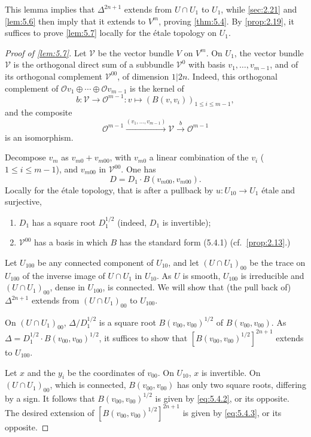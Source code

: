 \documentclass[11pt,a4paper]{article}
\theoremstyle{plain}
\theoremstyle{definition}
\begin{document}
This lemma implies that $\Delta^{2n+1}$ extends from $U \cap U_1$ to $U_1$, while \ref{sec:2.21} and \ref{lem:5.6} then imply that it extends to $V^m$, proving \ref{thm:5.4}. By \ref{prop:2.19}, it suffices to prove \ref{lem:5.7} locally for the \'etale topology on $U_1$.

\begin{proof}[Proof of \ref{lem:5.7}]
Let $\mathcal{V}$ be the vector bundle $V$ on $V^m$. On $U_1$, the vector bundle $\mathcal{V}$ is the orthogonal direct sum of a subbundle $\mathcal{V}^0$ with basis $v_1,\dots,v_{m-1}$, and of its orthogonal complement $\mathcal{V}^{00}$, of dimension $1|2n$. Indeed, this orthogonal complement of $\mathcal{O}v_1 \oplus \cdots \oplus \mathcal{O}v_{m-1}$ is the kernel of
\[
b : \mathcal{V} \to \mathcal{O}^{m-1} : v \mapsto (B(v, v_i))_{1 \leq i \leq m-1},
\]
and the composite
\[
\mathcal{O}^{m-1} \xrightarrow{(v_1,\dots,v_{m-1})} \mathcal{V} \xrightarrow{b} \mathcal{O}^{m-1}
\]
is an isomorphism.

Decompose $v_m$ as $v_{m0} + v_{m00}$, with $v_{m0}$ a linear combination of the $v_i$ ($1 \leq i \leq m-1$), and $v_{m00}$ in $\mathcal{V}^{00}$. One has
\[
D = D_1 \cdot B(v_{m00}, v_{m00}).
\]
Locally for the \'etale topology, that is after a pullback by $u: U_{10} \to U_1$ \'etale and surjective,
\begin{enumerate}[label=(\alph*)]
\item $D_1$ has a square root $D_1^{1/2}$ (indeed, $D_1$ is invertible);
\item $\mathcal{V}^{00}$ has a basis in which $B$ has the standard form (5.4.1) (cf.~\ref{prop:2.13}.)
\end{enumerate}

Let $U_{100}$ be any connected component of $U_{10}$, and let $(U \cap U_1)_{00}$ be the trace on $U_{100}$ of the inverse image of $U \cap U_1$ in $U_{10}$. As $U$ is smooth, $U_{100}$ is irreducible and $(U \cap U_1)_{00}$, dense in $U_{100}$, is connected. We will show that (the pull back of) $\Delta^{2n+1}$ extends from $(U \cap U_1)_{00}$ to $U_{100}$.

On $(U \cap U_1)_{00}$, $\Delta/D_1^{1/2}$ is a square root $B(v_{00}, v_{00})^{1/2}$ of $B(v_{00}, v_{00})$. As $\Delta = D_1^{1/2} \cdot B(v_{00}, v_{00})^{1/2}$, it suffices to show that $[B(v_{00}, v_{00})^{1/2}]^{2n+1}$ extends to $U_{100}$.

Let $x$ and the $y_i$ be the coordinates of $v_{00}$. On $U_{10}$, $x$ is invertible. On $(U \cap U_1)_{00}$, which is connected, $B(v_{00}, v_{00})$ has only two square roots, differing by a sign. It follows that $B(v_{00}, v_{00})^{1/2}$ is given by \eqref{eq:5.4.2}, or its opposite. The desired extension of $[B(v_{00}, v_{00})^{1/2}]^{2n+1}$ is given by \eqref{eq:5.4.3}, or its opposite.
\end{proof}
\end{document}

